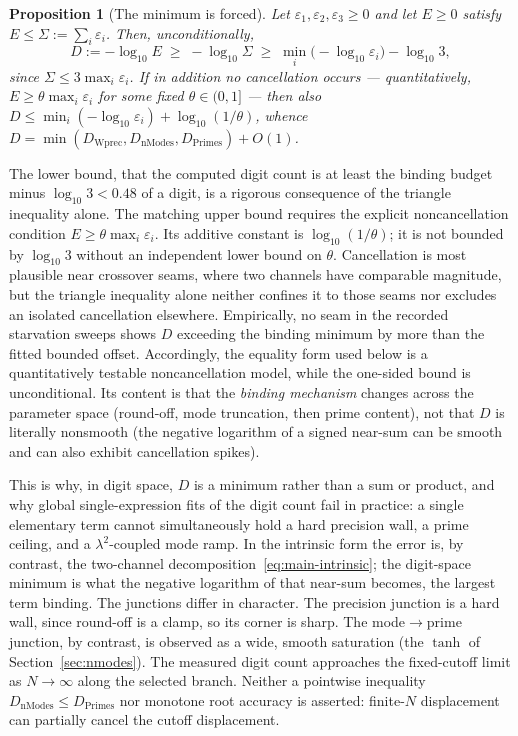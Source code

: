 \documentclass[11pt,a4paper]{article}
\newtheorem{proposition}{Proposition}
\begin{document}
\begin{proposition}[The minimum is forced]\label{prop:min}
Let $\varepsilon_1,\varepsilon_2,\varepsilon_3\ge0$ and let $E\ge0$ satisfy
$E\le\Sigma:=\sum_i\varepsilon_i$. Then, unconditionally,
\[
  D:=-\log_{10}E\;\ge\;-\log_{10}\Sigma
  \;\ge\;\min_i\bigl(-\log_{10}\varepsilon_i\bigr)-\log_{10}3 ,
\]
since $\Sigma\le 3\max_i\varepsilon_i$. If in addition no cancellation occurs
--- quantitatively, $E\ge\theta\max_i\varepsilon_i$ for some fixed
$\theta\in(0,1]$ --- then also
$D\le\min_i(-\log_{10}\varepsilon_i)+\log_{10}(1/\theta)$, whence
$D=\min(D_{\mathrm{Wprec}},D_{\mathrm{nModes}},D_{\mathrm{Primes}})+O(1)$.
\end{proposition}

The lower bound, that the computed digit count is at least the binding budget
minus $\log_{10}3<0.48$ of a digit, is a rigorous consequence of the triangle
inequality alone. The matching upper bound requires the explicit
noncancellation condition $E\ge\theta\max_i\varepsilon_i$. Its additive
constant is $\log_{10}(1/\theta)$; it is not bounded by $\log_{10}3$ without an
independent lower bound on $\theta$. Cancellation is most plausible near
crossover seams, where two channels have comparable magnitude, but the
triangle inequality alone neither confines it to those seams nor excludes an
isolated cancellation elsewhere. Empirically, no seam in the recorded
starvation sweeps shows $D$ exceeding the binding minimum by more than the
fitted bounded offset. Accordingly, the equality form used below is
a quantitatively testable noncancellation model, while the one-sided bound is
unconditional. Its content is that the \emph{binding mechanism} changes across
the parameter space (round-off, mode truncation, then prime content), not that
$D$ is literally nonsmooth (the negative logarithm of a signed near-sum can be
smooth and can also exhibit cancellation spikes).

This is why, in digit space, $D$ is a minimum rather than a sum or product, and
why global single-expression fits of the digit count fail in practice: a single
elementary term cannot simultaneously hold a hard precision wall, a prime
ceiling, and a $\lambda^2$-coupled mode ramp. In the intrinsic form the error
is, by contrast, the two-channel decomposition~\eqref{eq:main-intrinsic}; the
digit-space minimum
is what the negative logarithm of that near-sum becomes, the largest term
binding. The junctions differ in character.
The precision junction is a hard wall, since round-off is a clamp, so its corner
is sharp. The mode$\to$prime junction, by contrast, is observed as a wide,
smooth saturation (the $\tanh$ of Section~\ref{sec:nmodes}). The measured digit
count approaches the fixed-cutoff limit as $N\to\infty$ along the selected
branch. Neither a pointwise inequality
$D_{\mathrm{nModes}}\le D_{\mathrm{Primes}}$ nor monotone root accuracy is
asserted: finite-$N$ displacement can partially cancel the cutoff displacement.
\end{document}
